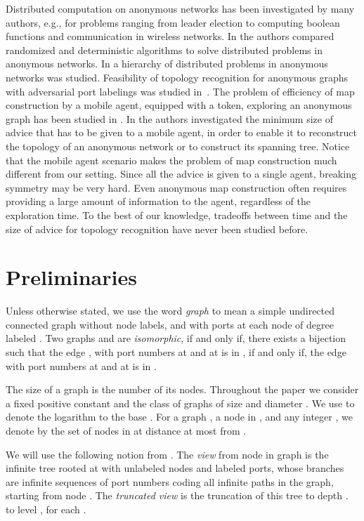 \documentclass{article}
\begin{document}
Distributed computation on anonymous networks has been investigated by many authors, e.g.,
\cite{An,ASW,BV,EPSW,ESW,FP2, KKV,Pe,YK3}
for problems ranging from leader election to computing boolean functions
and communication in wireless networks. 
In \cite{EPSW} the authors compared randomized and deterministic algorithms to solve distributed problems in anonymous networks.
In \cite{ESW} a hierarchy of distributed problems in anonymous networks was studied.
Feasibility of topology recognition for anonymous graphs with adversarial port labelings was studied in~\cite{YK3}.
The problem of efficiency of map construction by a mobile agent, equipped with a token, exploring an anonymous graph  has
been studied in \cite{CDK}. In \cite{DP} the authors investigated the minimum size of advice
that has to be given to a mobile agent, in order to enable it to reconstruct  the topology of an anonymous network or to construct its spanning tree.
Notice that the mobile agent scenario makes the problem of map construction much different from our setting. Since all the advice is given to a single agent,
breaking symmetry may be very hard. Even anonymous map construction often requires providing a large amount of information to the agent, regardless of the exploration time. 
To the best of our knowledge, tradeoffs between time and the size of advice for topology recognition have never been studied before.

\section{Preliminaries}
Unless otherwise stated, we use the word {\em graph} to mean a simple undirected connected graph without node labels, and with ports at each node of degree  labeled . 
Two graphs  and  are {\em isomorphic}, if and only if, there exists a bijection  such that the edge
, with port numbers  at  and  at  is in , if and only if, the edge  with port numbers  at  and  at  is in .

The size of a graph is the number of its nodes. Throughout the paper we consider a fixed positive constant  and the class of graphs of size  and diameter . We use  to denote the logarithm to the base .
For a graph , a node  in , and any integer , we denote by  the set of nodes in  at distance at most  from .


We will use the following notion from \cite{YK3}. 
The {\em view} from node  in graph  is the infinite tree   rooted at  with unlabeled nodes and labeled ports, whose branches are infinite sequences of port numbers coding all infinite paths in the graph, starting from node . The {\em truncated view}  is the truncation of this tree to depth . to level , for each .
 
\end{document}
